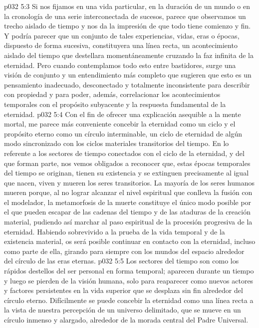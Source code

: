 \vs p032 5:3 \pc Si nos fijamos en una vida particular, en la duración de un mundo o en la cronología de una serie interconectada de sucesos, parece que observamos un trecho aislado de tiempo y nos da la impresión de que todo tiene comienzo y fin. Y podría parecer que un conjunto de tales experiencias, vidas, eras o épocas, dispuesto de forma sucesiva, constituyera una línea recta, un acontecimiento aislado del tiempo que destellara momentáneamente cruzando la faz infinita de la eternidad. Pero cuando contemplamos todo esto entre bastidores, surge una visión de conjunto y un entendimiento más completo que sugieren que esto es un pensamiento inadecuado, desconectado y totalmente inconsistente para describir con propiedad y para poder, además, correlacionar los acontecimientos temporales con el propósito subyacente y la respuesta fundamental de la eternidad.
\vs p032 5:4 Con el fin de ofrecer una explicación asequible a la mente mortal, me parece más conveniente concebir la eternidad como un ciclo y el propósito eterno como un círculo interminable, un ciclo de eternidad de algún modo sincronizado con los ciclos materiales transitorios del tiempo. En lo referente a los sectores de tiempo conectados con el ciclo de la eternidad, y del que forman parte, nos vemos obligados a reconocer que, estas épocas temporales del tiempo se originan, tienen su existencia y se extinguen precisamente al igual que nacen, viven y mueren los seres transitorios. La mayoría de los seres humanos mueren porque, al no lograr alcanzar el nivel espiritual que conlleva la fusión con el modelador, la metamorfosis de la muerte constituye el único modo posible por el que pueden escapar de las cadenas del tiempo y de las ataduras de la creación material, pudiendo así marchar al paso espiritual de la procesión progresiva de la eternidad. Habiendo sobrevivido a la prueba de la vida temporal y de la existencia material, os será posible continuar en contacto con la eternidad, incluso como parte de ella, girando para siempre con los mundos del espacio alrededor del círculo de las eras eternas.
\vs p032 5:5 Los sectores del tiempo son como los rápidos destellos del ser personal en forma temporal; aparecen durante un tiempo y luego se pierden de la visión humana, solo para reaparecer como nuevos actores y factores persistentes en la vida superior que se desplaza sin fin alrededor del círculo eterno. Difícilmente se puede concebir la eternidad como una línea recta a la vista de nuestra percepción de un universo delimitado, que se mueve en un círculo inmenso y alargado, alrededor de la morada central del Padre Universal.

